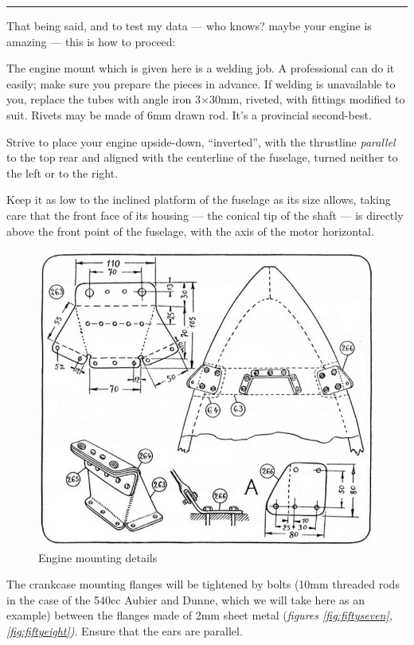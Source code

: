 \documentclass{book}
\newcommand*\circled[1]{\tikz[baseline=(char.base)]{
    \node[shape=circle,draw,inner sep=0.15pt] (char) {\footnotesize#1};}}
\newcommand*\sectline{
  \vspace{5pt}
  \begin{center}
    \rule{0.5\linewidth}{\linethickness}
  \end{center}
  \vspace{5pt}
}
\begin{document}
\sectline

That being said, and to test my data --- who knows?  maybe your engine
is amazing --- this is how to proceed:

The engine mount which is given here is a welding job.  A professional
can do it easily; make sure you prepare the pieces in advance.  If
welding is unavailable to you, replace the tubes with angle iron
3$\times$30mm, riveted, with fittings modified to suit.  Rivets may be
made of 6mm drawn rod.  It's a provincial second-best.

Strive to place your engine upside-down, ``inverted'', with the
thrustline \textit{parallel} to the top rear and aligned with the
centerline of the fuselage, turned neither to the left or to the
right.

Keep it as low to the inclined platform of the fuselage as its size
allows, taking care that the front face of its housing --- the conical
tip of the shaft --- is directly above the front point of the
fuselage, with the axis of the motor horizontal.

\begin{figure}
  \includegraphics[width=\linewidth]{fig-56.jpg}
  \caption{Engine mounting details}
  \label{fig:fiftysix}
\end{figure}

The crankcase mounting flanges will be tightened by bolts (10mm
threaded rods in the case of the 540cc Aubier and Dunne, which we will
take here as an example) between the flanges \circled{267} made of 2mm
sheet metal (\textit {figures \ref{fig:fiftyseven},
  \ref{fig:fiftyeight})}. Ensure that the ears \circled{268} are
parallel.
\end{document}
